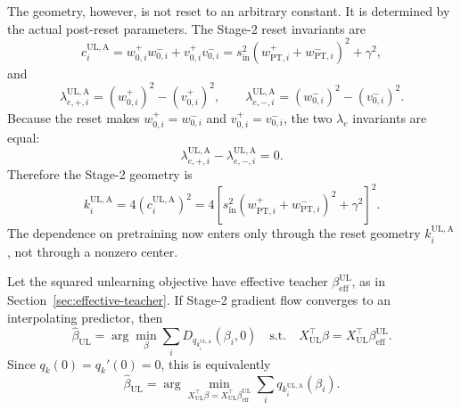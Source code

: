 \documentclass[11pt]{article}
\begin{document}
The geometry, however, is not reset to an arbitrary constant.  It is determined
by the actual post-reset parameters.  The Stage-2 reset invariants are
\begin{equation}
    c_i^{\mathrm{UL,A}}
    =
    w_{0,i}^{+}w_{0,i}^{-}
    +
    v_{0,i}^{+}v_{0,i}^{-}
    =
    s_{\mathrm{in}}^2
    \left(
        w_{\mathrm{PT},i}^{+}
        +
        w_{\mathrm{PT},i}^{-}
    \right)^2
    +
    \gamma^2,
\end{equation}
and
\begin{equation}
    \lambda_{e,+,i}^{\mathrm{UL,A}}
    =
    (w_{0,i}^{+})^2-(v_{0,i}^{+})^2,
    \qquad
    \lambda_{e,-,i}^{\mathrm{UL,A}}
    =
    (w_{0,i}^{-})^2-(v_{0,i}^{-})^2.
\end{equation}
Because the reset makes \(w_{0,i}^{+}=w_{0,i}^{-}\) and
\(v_{0,i}^{+}=v_{0,i}^{-}\), the two \(\lambda_e\) invariants are equal:
\begin{equation}
    \lambda_{e,+,i}^{\mathrm{UL,A}}
    -
    \lambda_{e,-,i}^{\mathrm{UL,A}}
    =
    0.
\end{equation}
Therefore the Stage-2 geometry is
\begin{equation}
    \boxed{
    k_i^{\mathrm{UL,A}}
    =
    4
    \left(
        c_i^{\mathrm{UL,A}}
    \right)^2
    =
    4
    \left[
        s_{\mathrm{in}}^2
        \left(
            w_{\mathrm{PT},i}^{+}
            +
            w_{\mathrm{PT},i}^{-}
        \right)^2
        +
        \gamma^2
    \right]^2 .
    }
\end{equation}
The dependence on pretraining now enters only through the reset geometry
\(k_i^{\mathrm{UL,A}}\), not through a nonzero center.

Let the squared unlearning objective have effective teacher
\(\beta_{\mathrm{eff}}^{\mathrm{UL}}\), as in
Section~\ref{sec:effective-teacher}.  If Stage-2 gradient flow converges to an
interpolating predictor, then
\begin{equation}
    \boxed{
    \widehat\beta_{\mathrm{UL}}
    =
    \arg\min_{\beta}
    \sum_i
    D_{q_{k_i^{\mathrm{UL,A}}}}(\beta_i,0)
    \quad
    \mathrm{s.t.}
    \quad
    X_{\mathrm{UL}}^\top\beta
    =
    X_{\mathrm{UL}}^\top\beta_{\mathrm{eff}}^{\mathrm{UL}} .
    }
\end{equation}
Since \(q_k(0)=q_k'(0)=0\), this is equivalently
\begin{equation}
    \boxed{
    \widehat\beta_{\mathrm{UL}}
    =
    \arg\min_{
        X_{\mathrm{UL}}^\top\beta
        =
        X_{\mathrm{UL}}^\top\beta_{\mathrm{eff}}^{\mathrm{UL}}
    }
    \sum_i q_{k_i^{\mathrm{UL,A}}}(\beta_i).
    }
\end{equation}
\end{document}
